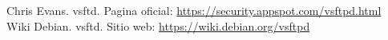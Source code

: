 \def\bibname{\centerline{Referencias}}

\begin{thebibliography}{99}
	  Chris Evans. vsftd. Pagina oficial: \url{https://security.appspot.com/vsftpd.html}\\
	  Wiki Debian. vsftd. Sitio web: \url{https://wiki.debian.org/vsftpd}\\
\end{thebibliography}


